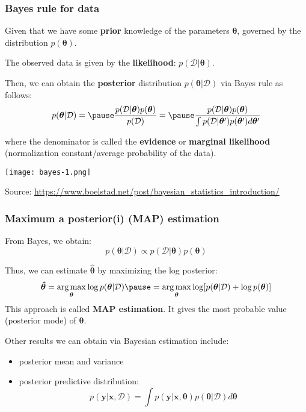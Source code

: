 \documentclass[smaller]{beamer}
\DeclareMathOperator*{\argmax}{arg\,max}
\newcommand{\?}{\stackrel{?}{=}}
\newcommand{\fr}{\frac}
\begin{document}
\begin{frame}
  \frametitle{Bayes rule for data}
  Given that we  have some \textbf{prior} knowledge of the parameters $\bm\theta$, governed by the distribution $p(\bm\theta)$. \pause
  \bigskip

  The observed data is given by the \textbf{likelihood}: $p(\mathcal{D}|\bm\theta)$.

  
  \pause
  \bigskip
  
  Then, we can obtain the \textbf{posterior} distribution $p(\bm\theta|\mathcal{D})$ via Bayes rule as follows:
  \begin{equation}
    p(\bm\theta|\mathcal{D}) = \pause \fr{p(\mathcal{D}|\bm\theta)p(\bm\theta)}{p(\mathcal{D})}
    = \pause \fr{p(\mathcal{D}|\bm\theta)p(\bm\theta)}{\int p(\mathcal{D}|\bm\theta')p(\bm\theta') d\bm\theta'}
  \end{equation}

  \pause

  where the denominator is called the \textbf{evidence} or \textbf{marginal likelihood} (normalization constant/average
  probability of the data).

  \pause
  \begin{center}
    \texttt{[image: bayes-1.png]}
    
    {\scriptsize Source: \url{https://www.boelstad.net/post/bayesian_statistics_introduction/}}
  \end{center}
\end{frame}


\begin{frame}
  \frametitle{Maximum a posterior(i) (MAP) estimation}
  \pause
  From Bayes, we obtain:\pause
  \begin{equation}
     p(\bm\theta|\mathcal{D}) \propto p(\mathcal{D}|\bm\theta)p(\bm\theta)
   \end{equation}

   \pause
   Thus, we can estimate $\bm\hat\theta$ by maximizing the log posterior:\pause
   \begin{equation}
     \bm{\hat\theta} = \argmax_{\bm\theta}\log p(\bm\theta|\mathcal{D}) \pause = \argmax_{\bm\theta}\log [p(\bm\theta|\mathcal{D}) + \log p(\bm\theta)]
   \end{equation}
   \pause
   This approach is called \textbf{MAP estimation}. It gives the most probable value (posterior mode) of $\bm\theta$.

   \pause
   \bigskip
   Other results we can obtain via Bayesian estimation include:\pause
   \begin{itemize}
   \item posterior mean and variance\pause
   \item posterior predictive distribution: \pause
     \begin{equation}
       p(\bm y |\bm x, \mathcal{D}) = \int p(\bm y|\bm x, \bm\theta)p(\bm\theta|\mathcal{D})d\bm\theta       
     \end{equation}
   \end{itemize}
\end{frame}
\end{document}
